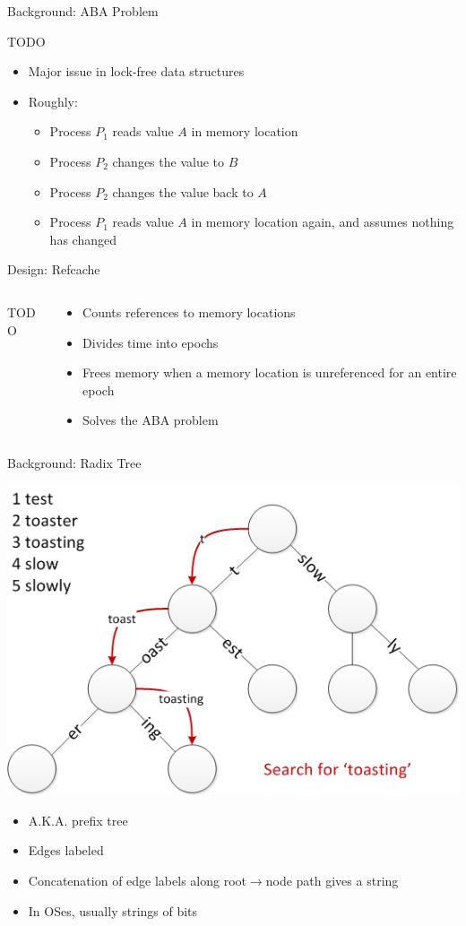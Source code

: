 \documentclass[aspectratio=169]{beamer}
\newcommand{\bi}{\begin{itemize}}
\newcommand{\ei}{\end{itemize}}
\begin{document}
\begin{frame}{Background: ABA Problem}
  \begin{center}
    TODO
    \bi
  \item Major issue in lock-free data structures
  \item Roughly:
    \bi
  \item Process $P_1$ reads value $A$ in memory location
  \item Process $P_2$ changes the value to $B$
  \item Process $P_2$ changes the value back to $A$
  \item Process $P_1$ reads value $A$ in memory location again, and assumes nothing has changed
    \ei
    \ei
  \end{center}
\end{frame}

\begin{frame}{Design: Refcache}
  \begin{columns}[T]
    \begin{column}{0.2\textwidth}
      TODO
    \end{column}
    \begin{column}{0.8\textwidth}
      \bi
    \item Counts references to memory locations
    \item Divides time into epochs
    \item Frees memory when a memory location is unreferenced for an entire epoch
    \item Solves the ABA problem
      \ei
    \end{column}
  \end{columns}
\end{frame}

\begin{frame}{Background: Radix Tree}
  \begin{center}
    \includegraphics[scale=0.5]{./figures/Patricia_trie.png}
    \bi
  \item A.K.A. prefix tree
  \item Edges labeled
  \item Concatenation of edge labels along root$\rightarrow$node path gives a string
  \item In OSes, usually strings of bits
    \ei
  \end{center}
\end{frame}
\end{document}
